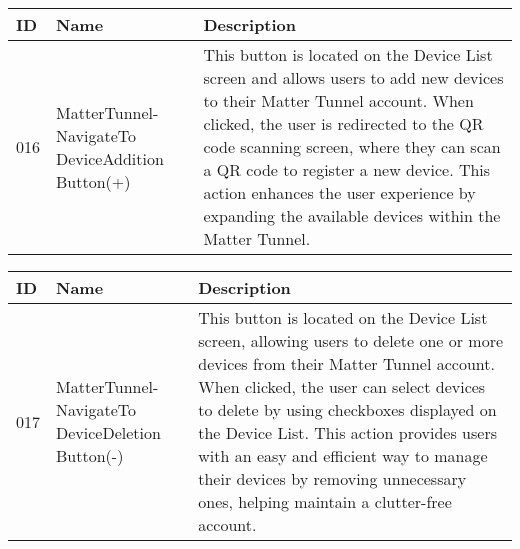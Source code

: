 \documentclass[conference]{IEEEtran}
\begin{document}
\begin{enumerate}[itemsep=2ex, parsep=1ex]
\begin{enumerate}[itemsep=2ex, parsep=1ex]
	      	      \begin{table}[h!]
	      	      	\def\arraystretch{1.24} \small
	      	      	\begin{tabular}{|p{1.2cm}|p{2.5cm}|p{4.0cm}|}
	      	      		\hline
	      	      		ID  & Name                                             & Description                                                                                                                                                                                                                                                                                                                                             \\
	      	      		\hline
	      	      		016 & MatterTunnel-NavigateTo DeviceAddition Button(+) & This button is located on the Device List screen and allows users to add new devices to their Matter Tunnel account. When clicked, the user is redirected to the QR code scanning screen, where they can scan a QR code to register a new device. This action enhances the user experience by expanding the available devices within the Matter Tunnel. \\
	      	      		\hline
	      	      	\end{tabular}
	      	      \end{table}
	      	      
	      	      \begin{table}[h!]
	      	      	\def\arraystretch{1.24} \small
	      	      	\begin{tabular}{|p{1.2cm}|p{2.5cm}|p{4.0cm}|}
	      	      		\hline
	      	      		ID  & Name                                             & Description                                                                                                                                                                                                                                                                                                                                                                                     \\
	      	      		\hline
	      	      		017 & MatterTunnel-NavigateTo DeviceDeletion Button(-) & This button is located on the Device List screen, allowing users to delete one or more devices from their Matter Tunnel account. When clicked, the user can select devices to delete by using checkboxes displayed on the Device List. This action provides users with an easy and efficient way to manage their devices by removing unnecessary ones, helping maintain a clutter-free account. \\
	      	      		\hline
	      	      	\end{tabular}
	      	      \end{table}
	      	      

\end{enumerate}
\end{enumerate}
\end{document}
